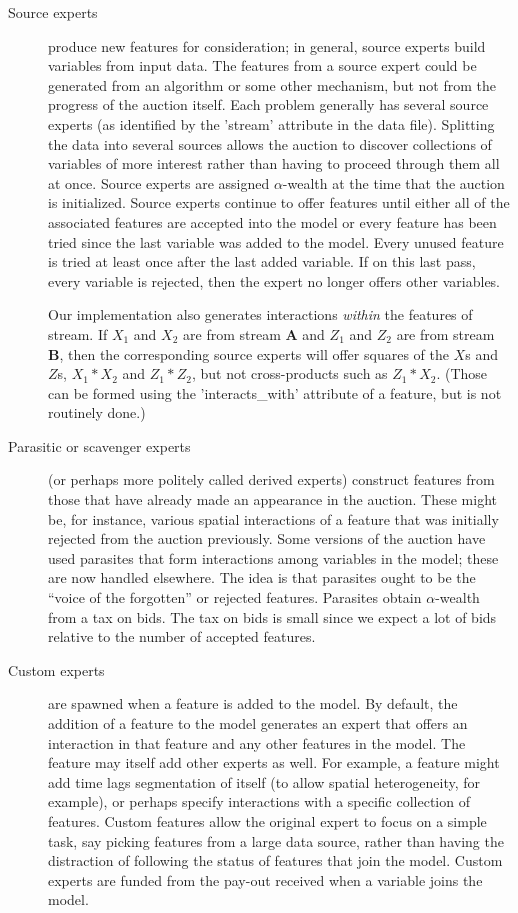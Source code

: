 \documentclass[12pt]{article}
\begin{document}
\begin{description}

\item[Source experts] produce new features for consideration; in general, source
 experts build variables from input data.  The features from a source expert
 could be generated from an algorithm or some other mechanism, but not from the
 progress of the auction itself.  Each problem generally has several source
 experts (as identified by the 'stream' attribute in the data file).  Splitting
 the data into several sources allows the auction to discover collections of
 variables of more interest rather than having to proceed through them all at
 once.  Source experts are assigned $\alpha$-wealth at the time that the auction
 is initialized.  Source experts continue to offer features until either all of
 the associated features are accepted into the model or every feature has been
 tried since the last variable was added to the model.  Every unused feature is
 tried at least once after the last added variable.  If on this last pass, every
 variable is rejected, then the expert no longer offers other variables.

 Our implementation also generates interactions {\em within}
 the features of stream.  If $X_1$ and $X_2$ are from stream {\bf A} and $Z_1$
 and $Z_2$ are from stream {\bf B}, then the corresponding source experts will
 offer squares of the $X$s and $Z$s, $X_1*X_2$ and $Z_1*Z_2$, but not
 cross-products such as $Z_1*X_2$.  (Those can be formed using the
 'interacts\_with' attribute of a feature, but is not routinely done.)

\item[Parasitic or scavenger experts] (or perhaps more politely called derived
 experts) construct features from those that have already made an appearance in
 the auction.  These might be, for instance, various spatial interactions of a
 feature that was initially rejected from the auction previously.  Some versions
 of the auction have used parasites that form interactions among variables in
 the model; these are now handled elsewhere.  The idea is that parasites ought
 to be the ``voice of the forgotten'' or rejected features.  Parasites obtain
 $\alpha$-wealth from a tax on bids.  The tax on bids is small since we expect a
 lot of bids relative to the number of accepted features.

\item[Custom experts] are spawned when a feature is added to the model.  By
 default, the addition of a feature to the model generates an expert that offers
 an interaction in that feature and any other features in the model.  The
 feature may itself add other experts as well.  For example, a feature might add
 time lags segmentation of itself (to allow spatial heterogeneity, for
 example), or perhaps specify interactions with a specific collection of
 features.  Custom features allow the original expert to focus on a simple task,
 say picking features from a large data source, rather than having the
 distraction of following the status of features that join the model.  Custom
 experts are funded from the pay-out received when a variable joins the model.


\end{description}
\end{document}
